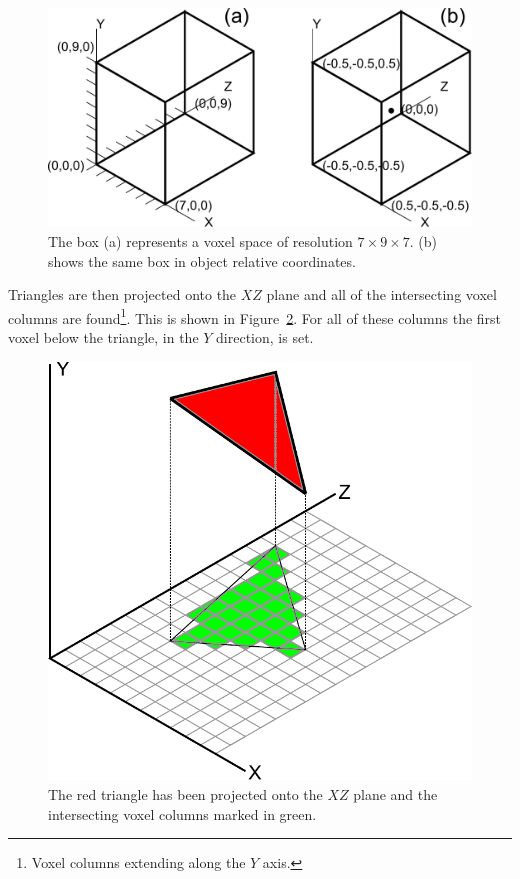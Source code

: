 \begin{figure}
\centerline{\includegraphics[scale=0.5]{coordinates13.pdf}}
\caption{The box (a) represents a voxel space of resolution $7\times9\times7$. (b) shows the same box in object relative coordinates.}
\label{fig:3.2}
\end{figure}

Triangles are then projected onto the $XZ$ plane and all of the intersecting voxel columns are found\footnote{Voxel columns extending along the $Y$ axis.}. This is shown in Figure~\ref{fig:3.2.1}. For all of these columns the first voxel below the triangle, in the $Y$ direction, is set.

\begin{figure}
\centerline{\includegraphics[scale=0.5]{projection13.pdf}}
\caption{The red triangle has been projected onto the $XZ$ plane and the intersecting voxel columns marked in green.}
\label{fig:3.2.1}
\end{figure}

